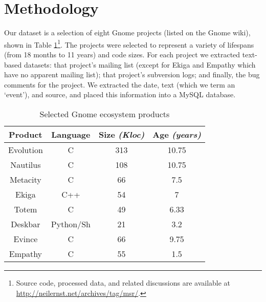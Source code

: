 \documentclass[conference, compsoc]{IEEEtran}
\begin{document}
\vspace{-2mm}
\section{Methodology}
\vspace{-2mm}
\label{sec:Method}
Our dataset is a selection of eight Gnome projects (listed on the Gnome wiki), shown in Table \ref{tbl:projects}\footnote{Source code, processed data, and related discussions are available at \url{http://neilernst.net/archives/tag/msr/}.}. The projects were selected to represent a variety of lifespans (from 18 months to 11 years) and code sizes. For each project we extracted text-based datasets: that project's mailing list (except for Ekiga and Empathy which have no apparent mailing list); that project's subversion logs; and finally, the bug comments for the project. We extracted the date, text (which we term an `event'), and source, and placed this information into a MySQL database.

\begin{table}
	\caption{Selected Gnome ecosystem products}
	\centering
	\label{tbl:projects}
\begin{tabular}{|c|c|c|c|}
\hline
\rowcolor[gray]{.9} 
\textbf{Product} & \textbf{Language} & \textbf{Size} \emph{(Kloc)} & \textbf{Age} \emph{(years)} \\
\hline
\hline 
Evolution & C & 313 & 10.75\\ \hline
Nautilus & C & 108 & 10.75  \\ \hline
Metacity & C & 66 & 7.5  \\ \hline
Ekiga & C++ & 54 & 7  \\ \hline
Totem & C & 49 & 6.33  \\ \hline
Deskbar & Python/Sh & 21 & 3.2  \\ \hline
Evince & C & 66 & 9.75\\ \hline
Empathy &C & 55 & 1.5\\ 
\hline
\end{tabular}
\end{table}
\end{document}
